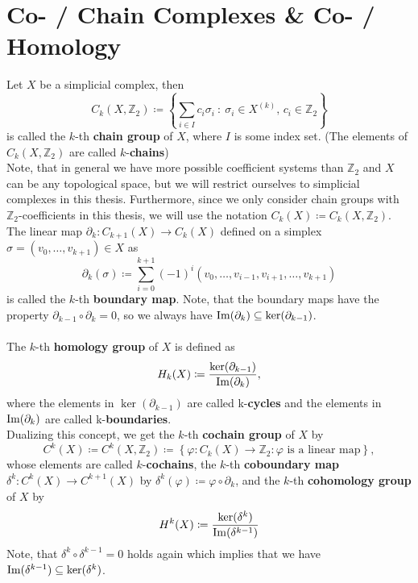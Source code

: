 \section*{Co- / Chain Complexes \& Co- / Homology}

Let \(X\) be a simplicial complex, then
\[
C_k(X,\mathbb{Z}_2)\coloneqq \left\{\sum\limits_{i\in I}c_i\sigma_i\::\:\sigma_i\in X^{(k)}\text{, }c_i\in\mathbb{Z}_2\right\}
\]
is called the \(k\)-th \textbf{chain group} of \(X\), where \(I\) is some index set. (The elements of \(C_k(X,\mathbb{Z}_2)\) are called \(k\)-\textbf{chains})\\
Note, that in general we have more possible coefficient systems than \(\mathbb{Z}_2\) and \(X\) can be any topological space, but we will restrict ourselves to simplicial complexes in this thesis. Furthermore, since we only consider chain groups with \(\mathbb{Z}_2\)-coefficients in this thesis, we will use the notation \(C_k(X)\coloneqq C_k(X,\mathbb{Z}_2)\).\\
The linear map \(\partial_k:C_{k+1}(X)\rightarrow C_k(X)\) defined on a simplex \(\sigma=(v_0,\ldots,v_{k+1})\in X\) as
\[
\partial_k(\sigma)\coloneqq \sum\limits_{i=0}^{k+1}(-1)^i(v_0,\ldots,v_{i-1},v_{i+1},\ldots,v_{k+1})
\]
is called the \(k\)-th \textbf{boundary map}. Note, that the boundary maps have the property \(\partial_{k-1}\circ\partial_k=0\), so we always have \(\mathrm{Im}(\partial_k)\subseteq\ker(\partial_{k-1})\).\\
\\
The \(k\)-th \textbf{homology group} of \(X\) is defined as
\[
H_k(X)\coloneqq \frac{\ker(\partial_{k-1})}{\mathrm{Im}(\partial_k)},
\]
where the elements in \(\ker(\partial_{k-1})\) are called k-\textbf{cycles} and the elements in \(\mathrm{Im}(\partial_k)\) are called k-\textbf{boundaries}.\\
Dualizing this concept, we get the \(k\)-th \textbf{cochain group} of \(X\) by
\[
C^k(X)\coloneqq C^k(X,\mathbb{Z}_2)\coloneqq \left\{\varphi:C_k(X)\rightarrow\mathbb{Z}_2:\varphi\text{ is a linear map}\right\},
\]
whose elements are called \(k\)-\textbf{cochains}, the \(k\)-th \textbf{coboundary map} \\
\(\delta^k:C^k(X)\rightarrow C^{k+1}(X)\) by \(\delta^k(\varphi)\coloneqq \varphi\circ\partial_k\), and the \(k\)-th \textbf{cohomology group} of \(X\) by
\[
H^k(X)\coloneqq \frac{\ker(\delta^k)}{\mathrm{Im}(\delta^{k-1})}
\]
Note, that \(\delta^k\circ\delta^{k-1}=0\) holds again which implies that we have \(\mathrm{Im}(\delta^{k-1})\subseteq\ker(\delta^k)\).\\
